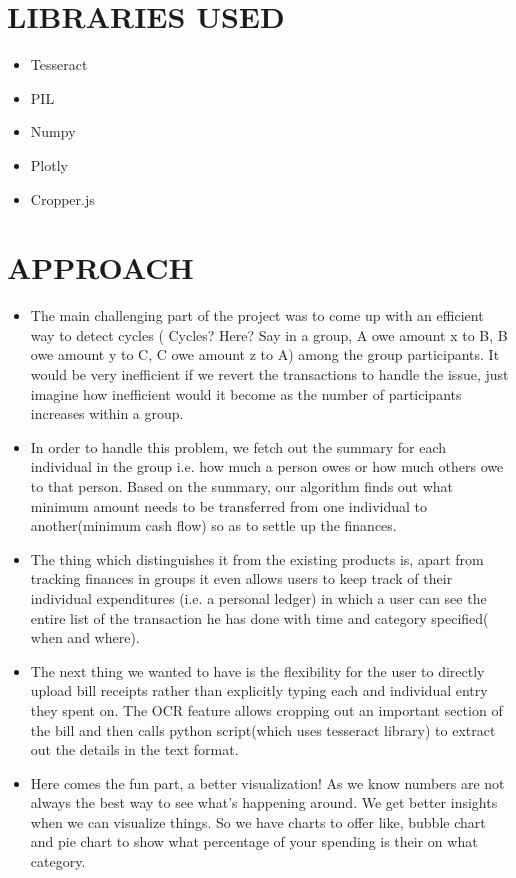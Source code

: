 \documentclass[12pt]{article}
\begin{document}
\section{LIBRARIES USED}
\begin{itemize}
    \item Tesseract
    \item PIL
    \item Numpy
    \item Plotly
    \item Cropper.js
\end{itemize}



\pagebreak

\section{APPROACH}
\begin{itemize}
    \item The main challenging part of the project was to come up with an efficient way to detect cycles ( Cycles? Here? Say in a group, A owe amount x to B, B owe amount y to C, C owe amount z to A) among the group participants. It would be very inefficient if we revert the transactions to handle the issue, just imagine how inefficient would it become as the number of participants increases within a  group. 
    \item In order to handle this problem, we fetch out the summary for each individual in the group i.e. how much a person owes or how much others owe to that person. Based on the summary, our algorithm finds out what minimum amount needs to be transferred from one individual to another(minimum cash flow) so as to settle up the finances.
    \item The thing which distinguishes it from the existing products is, apart from tracking finances in groups it even allows users to keep track of their individual expenditures (i.e. a personal ledger) in which a user can see the entire list of the transaction he has done with time and category specified( when and where).
    \item The next thing we wanted to have is the flexibility for the user to directly upload bill receipts rather than explicitly typing each and individual entry they spent on. The OCR feature allows cropping out an important section of the bill and then calls python script(which uses tesseract library) to extract out the details in the text format.
    \item Here comes the fun part, a better visualization! As we know numbers are not always the best way to see what's happening around. We get better insights when we can visualize things. So we have charts to offer like, bubble chart and pie chart to show what percentage of your spending is their on what category.


\end{itemize}
\end{document}
